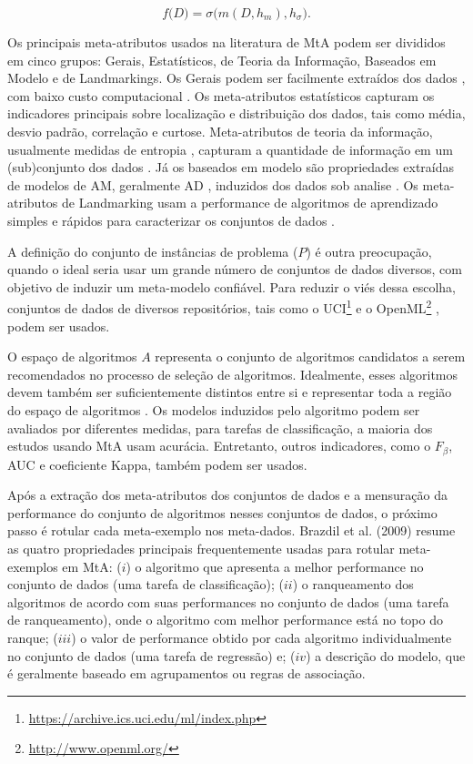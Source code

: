 \begin{equation}
    f\big(D\big) = \sigma\big(m(D,h_m), h_\sigma\big).
\end{equation}

Os principais meta-atributos usados na literatura de MtA podem ser
divididos em cinco grupos: Gerais, Estatísticos, de Teoria da Informação,
Baseados em Modelo e de Landmarkings. Os Gerais podem ser facilmente extraídos dos dados \cite{Reif2014}, com baixo
custo computacional \cite{Reif2012}.
Os meta-atributos estatísticos capturam os indicadores principais sobre
localização e distribuição dos dados, tais como média, desvio padrão,
correlação e curtose.
Meta-atributos de teoria da informação, usualmente medidas de entropia
\cite{Segrera2008}, capturam a quantidade de informação em um (sub)conjunto dos
dados \cite{SmithMiles2008}.
Já os baseados em modelo são propriedades extraídas de modelos de AM,
geralmente AD \cite{Bensusan2000, Peng2002}, induzidos dos dados sob analise
\cite{Reif2014}.
Os meta-atributos de Landmarking usam a performance de algoritmos de
aprendizado simples e rápidos para caracterizar os conjuntos de dados
\cite{SmithMiles2008}.

A definição do conjunto de instâncias de problema ($P$) é outra preocupação,
quando o ideal seria usar um grande número de conjuntos de dados diversos, com
objetivo de induzir um meta-modelo confiável.
Para reduzir o viés dessa escolha, conjuntos de dados de diversos repositórios,
tais como o UCI\footnote{\url{https://archive.ics.uci.edu/ml/index.php}}
\cite{Lichman2013} e o OpenML\footnote{\url{http://www.openml.org/}}
\cite{OpenML2013}, podem ser usados.

O espaço de algoritmos $A$ representa o conjunto de algoritmos candidatos a
serem recomendados no processo de seleção de algoritmos.
Idealmente, esses algoritmos devem também ser suficientemente distintos entre
si e representar toda a região do espaço de algoritmos \cite{Munoz2018}.
Os modelos induzidos pelo algoritmo podem ser avaliados por diferentes medidas,
para tarefas de classificação, a maioria dos estudos usando MtA usam acurácia.
Entretanto, outros indicadores, como o $F_\beta$, AUC e coeficiente Kappa,
também podem ser usados.

Após a extração dos meta-atributos dos conjuntos de dados e a mensuração da
performance do conjunto de algoritmos nesses conjuntos de dados, o próximo
passo é rotular cada meta-exemplo nos meta-dados.
Brazdil et al. (2009) \cite{Brazdil2009} resume as quatro propriedades
principais frequentemente usadas para rotular meta-exemplos em MtA: ($i$)
o algoritmo que apresenta a melhor performance no conjunto de dados (uma tarefa
de classificação); ($ii$) o ranqueamento dos algoritmos de acordo com suas
performances no conjunto de dados (uma tarefa de ranqueamento), onde o
algoritmo com melhor performance está no topo do ranque; ($iii$) o valor de
performance obtido por cada algoritmo individualmente no conjunto de dados (uma
tarefa de regressão) e; ($iv$) a descrição do modelo, que é geralmente baseado
em agrupamentos ou regras de associação.

